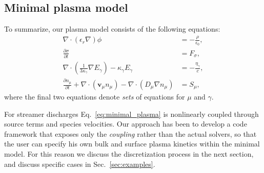 \documentclass[3p]{elsarticle}
\begin{document}

\subsection{Minimal plasma model}
To summarize, our plasma model consists of the following equations: 
\begin{subequations}
  \label{eq:minimal_plasma}
  \begin{align}
    \nabla\cdot(\epsilon_r\nabla)\phi &= -\frac{\rho}{\epsilon_0}, \\
    \frac{\partial \sigma}{\partial t} &= F_\sigma, \\
    \nabla\cdot\left(\frac{1}{3\kappa_\gamma}\nabla E_\gamma\right) - \kappa_\gamma E_{\gamma} &= -\frac{\eta_\gamma}{c}, \\
    \frac{\partial n_\mu}{\partial t} + \nabla\cdot\left(\bm{v}_\mu n_\mu\right) - \nabla\cdot\left(D_\mu\nabla n_\mu\right) &= S_\mu,
  \end{align}
\end{subequations}
where the final two equations denote \emph{sets} of equations for $\mu$ and $\gamma$.

For streamer discharges Eq.~\eqref{eq:minimal_plasma} is nonlinearly coupled through source terms and species velocities. Our approach has been to develop a code framework that exposes only the \emph{coupling} rather than the actual solvers, so that the user can specify his own bulk and surface plasma kinetics within the minimal model. For this reason we discuss the discretization process in the next section, and discuss specific cases in Sec.~\ref{sec:examples}. 
\end{document}
